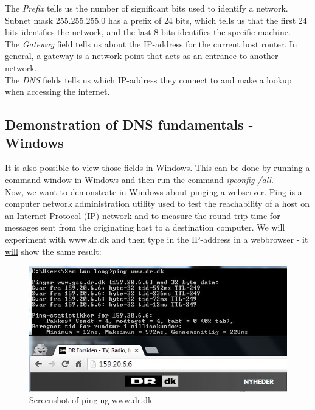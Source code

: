 The \textit{Prefix} tells us the number of significant bits used to identify a network. Subnet mask 255.255.255.0 has a prefix of 24 bits, which tells us that the first 24 bits identifies the network, and the last 8 bits identifies the specific machine. \\

The \textit{Gateway} field tells us about the IP-address for the current host router. In general, a gateway is a network point that acts as an entrance to another network. \\

The \textit{DNS} fields tells us which IP-address they connect to and make a lookup when accessing the internet. 

\subsection{Demonstration of DNS fundamentals - Windows}

It is also possible to view those fields in Windows. This can be done by running a command window in Windows and then run the command \textit{ipconfig /all}. \\

Now, we want to demonstrate in Windows about pinging a webserver. Ping is a computer network administration utility used to test the reachability of a host on an Internet Protocol (IP) network and to measure the round-trip time for messages sent from the originating host to a destination computer. 
We will experiment with www.dr.dk and then type in the IP-address in a webbrowser - it \underline{will} show the same result:

\begin{figure}[ht!]
\centering
\includegraphics[width=150mm]{img/ping.png}
\caption{Screenshot of pinging www.dr.dk}
\label{ping}
\end{figure}

